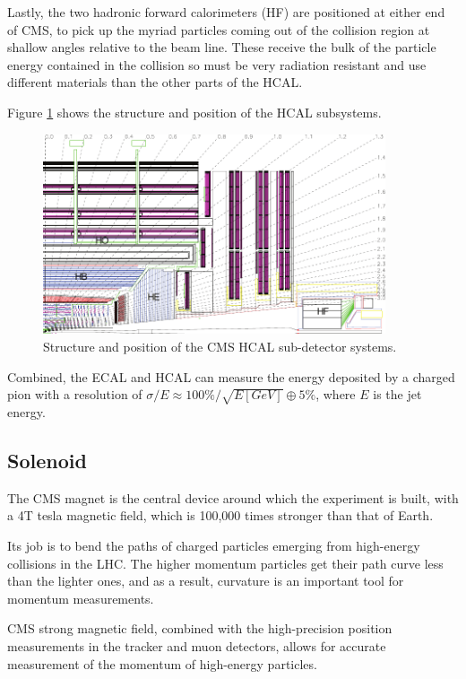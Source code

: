  Lastly, the two hadronic forward calorimeters (HF) are positioned at either end of CMS, to pick up the myriad particles coming out of the collision region at shallow angles relative to the beam line. These receive the bulk of the particle energy contained in the collision so must be very radiation resistant and use different materials than the other parts of the HCAL.

 Figure \ref{fig:cmshcal} shows the structure and position of the HCAL subsystems. 

     \begin{figure}[H]
 	\centering
 	\includegraphics[width=0.9\textwidth]{figures/HCAL_subdet.pdf}
 	\singlespace
 	\caption{Structure and position of the CMS HCAL sub-detector systems.}
 	\label{fig:cmshcal}
	 \end{figure}

Combined, the ECAL and HCAL can measure the energy deposited by a charged pion with a resolution of $\sigma/E\approx100\%/\sqrt{E[GeV]}\oplus5\%$, where $E$ is the jet energy.

 \subsection{Solenoid}

 The CMS magnet is the central device around which the experiment is built, with a 4T tesla magnetic field, which is 100,000 times stronger than that of Earth.

 Its job is to bend the paths of charged particles emerging from high-energy collisions in the LHC. The higher momentum particles get their path curve less than the lighter ones, and as a result, curvature is an important tool for momentum measurements. 

 CMS strong magnetic field, combined with the high-precision position measurements in the tracker and muon detectors, allows for accurate measurement of the momentum of high-energy particles.


